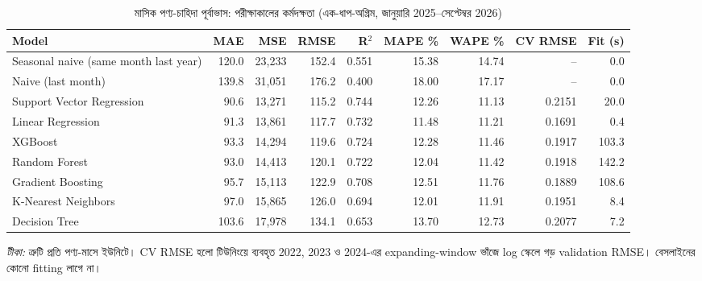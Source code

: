 \begin{table}[htbp]
\centering
\footnotesize
\caption{মাসিক পণ্য-চাহিদা পূর্বাভাস: পরীক্ষাকালের কর্মদক্ষতা (এক-ধাপ-অগ্রিম, জানুয়ারি 2025--সেপ্টেম্বর 2026)}
\label{tab:forecast}
\begin{adjustbox}{max width=\linewidth}
\begin{tabular}{lrrrrrrrr}
\toprule
\textbf{Model} & \textbf{MAE} & \textbf{MSE} & \textbf{RMSE} & \textbf{R$^2$} & \textbf{MAPE \%} & \textbf{WAPE \%} & \textbf{CV RMSE} & \textbf{Fit (s)} \\
\midrule
Seasonal naive (same month last year) & 120.0 & 23,233 & 152.4 & 0.551 & 15.38 & 14.74 & -- & 0.0 \\
Naive (last month) & 139.8 & 31,051 & 176.2 & 0.400 & 18.00 & 17.17 & -- & 0.0 \\
Support Vector Regression & 90.6 & 13,271 & 115.2 & 0.744 & 12.26 & 11.13 & 0.2151 & 20.0 \\
Linear Regression & 91.3 & 13,861 & 117.7 & 0.732 & 11.48 & 11.21 & 0.1691 & 0.4 \\
XGBoost & 93.3 & 14,294 & 119.6 & 0.724 & 12.28 & 11.46 & 0.1917 & 103.3 \\
Random Forest & 93.0 & 14,413 & 120.1 & 0.722 & 12.04 & 11.42 & 0.1918 & 142.2 \\
Gradient Boosting & 95.7 & 15,113 & 122.9 & 0.708 & 12.51 & 11.76 & 0.1889 & 108.6 \\
K-Nearest Neighbors & 97.0 & 15,865 & 126.0 & 0.694 & 12.01 & 11.91 & 0.1951 & 8.4 \\
Decision Tree & 103.6 & 17,978 & 134.1 & 0.653 & 13.70 & 12.73 & 0.2077 & 7.2 \\
\bottomrule
\end{tabular}
\end{adjustbox}
\par\smallskip\parbox{0.92\linewidth}{\footnotesize\emph{টীকা:} ত্রুটি প্রতি পণ্য-মাসে ইউনিটে। CV RMSE হলো টিউনিংয়ে ব্যবহৃত 2022, 2023 ও 2024-এর expanding-window ভাঁজে log স্কেলে গড় validation RMSE। বেসলাইনের কোনো fitting লাগে না।}
\end{table}